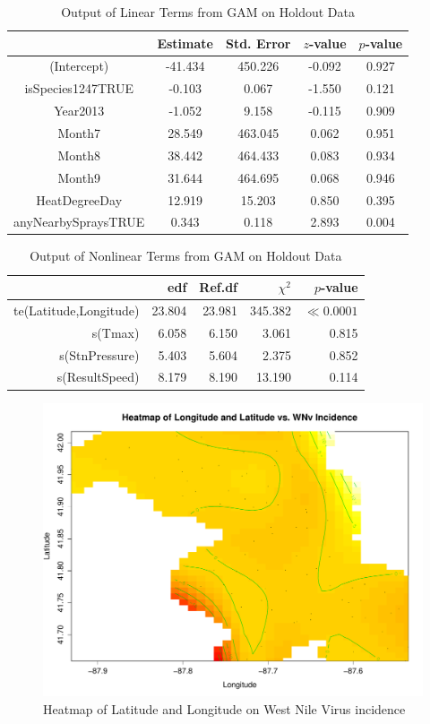 \documentclass[12pt]{article}
\begin{document}
\begin{table}[H] \center
\begin{tabular}{|c|cccc|} \hline
 & Estimate & Std. Error & $z$-value & $p$-value \\ 
  \hline
(Intercept) & -41.434 & 450.226 & -0.092 & 0.927 \\ 
  isSpecies1247TRUE & -0.103 & 0.067 & -1.550 & 0.121 \\ 
  Year2013 & -1.052 & 9.158 & -0.115 & 0.909 \\ 
  Month7 & 28.549 & 463.045 & 0.062 & 0.951 \\ 
  Month8 & 38.442 & 464.433 & 0.083 & 0.934 \\ 
  Month9 & 31.644 & 464.695 & 0.068 & 0.946 \\ 
  HeatDegreeDay & 12.919 & 15.203 & 0.850 & 0.395 \\ 
  anyNearbySpraysTRUE & 0.343 & 0.118 & 2.893 & 0.004 \\ 
   \hline
\end{tabular}
\caption*{Output of Linear Terms from GAM on Holdout Data}
\end{table}

\begin{table}[H]
\centering
\begin{tabular}{|r|rrrr|}
  \hline
 & edf & Ref.df & $\chi^2$ & $p$-value \\ 
  \hline
te(Latitude,Longitude) & 23.804 & 23.981 & 345.382 & $\ll 0.0001$ \\ 
  s(Tmax) & 6.058 & 6.150 & 3.061 & 0.815 \\ 
  s(StnPressure) & 5.403 & 5.604 & 2.375 & 0.852 \\ 
  s(ResultSpeed) & 8.179 & 8.190 & 13.190 & 0.114 \\ 
   \hline
\end{tabular}
\caption*{Output of Nonlinear Terms from GAM on Holdout Data}
\end{table}

\begin{figure}[H] \center
\includegraphics[scale=.60]{LatLongHeat_WNv.pdf}
\caption*{Heatmap of Latitude and Longitude on West Nile Virus incidence}
\end{figure}
\end{document}
